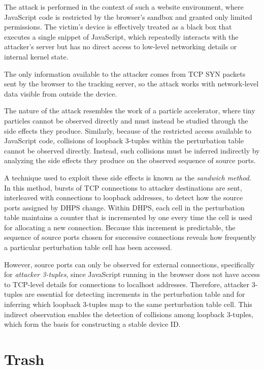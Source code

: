 \documentclass{report}
\begin{document}
The attack is performed in the context of such a website environment, where JavaScript code is restricted by the \alert{browser’s sandbox} and granted only limited permissions. The victim’s device is effectively treated as a \alert{black box} that executes a single snippet of JavaScript, which repeatedly interacts with the attacker’s server but has no direct access to low-level networking details or internal kernel state.

The only information available to the attacker comes from \alert{TCP SYN packets} sent by the browser to the tracking server, so the attack works with network-level data visible from outside the device.

The nature of the attack resembles the work of a particle accelerator, where tiny particles cannot be observed directly and must instead be studied through the side effects they produce. Similarly, because of the restricted access available to JavaScript code, collisions of loopback 3-tuples within the perturbation table cannot be observed directly. Instead, such collisions must be inferred indirectly by analyzing the side effects they produce on the observed sequence of source ports.

A technique used to exploit these side effects is known as the \emph{sandwich method}. In this method, bursts of TCP connections to attacker destinations are sent, interleaved with connections to loopback addresses, to detect how the source ports assigned by DHPS change. Within DHPS, each cell in the perturbation table maintains a counter that is incremented by one every time the cell is used for allocating a new connection. Because this increment is predictable, the sequence of source ports chosen for successive connections reveals how frequently a particular perturbation table cell has been accessed.

However, source ports can only be observed for external connections, specifically for \emph{attacker 3-tuples}, since JavaScript running in the browser does not have access to TCP-level details for connections to localhost addresses. Therefore, attacker 3-tuples are essential for detecting increments in the perturbation table and for inferring which loopback 3-tuples map to the same perturbation table cell. This indirect observation enables the detection of collisions among loopback 3-tuples, which form the basis for constructing a stable device ID.

\section {Trash}
\label{sec:trash}
\end{document}
